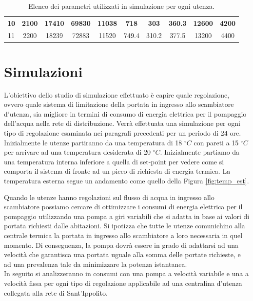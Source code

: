 \documentclass[laurea,oneside,11pt]{USiena_tesiLM3}
\begin{document}
\begin{table}[!ht]
{\begin{tabular}{|c|c|c|c|c|c|c|c|c|c|}
10              & 2100                                     & 17410        & 69830        & 11038       & 718         & 303         & 360.3       & 12600       & 4200        \\ \hline
11              & 2200                                     & 18239        & 72883        & 11520       & 749.4       & 310.2       & 377.5       & 13200       & 4400        \\ \hline
\end{tabular}}
\caption{Elenco dei parametri utilizzati in simulazione per ogni utenza.}
\label{tab:par_utenze}
\end{table}

\section{Simulazioni}
L'obiettivo dello studio di simulazione effettuato è capire quale regolazione, ovvero quale sistema di limitazione della portata in ingresso allo scambiatore d'utenza, sia migliore in termini di consumo di energia elettrica per il pompaggio dell'acqua nella rete di distribuzione. Verrà effettuata una simulazione per ogni tipo di regolazione esaminata nei paragrafi precedenti per un periodo di 24 ore. Inizialmente le utenze partiranno da una temperatura di 18 $^{\circ}C$ con pareti a 15 $^{\circ}C$ per arrivare ad una temperatura desiderata di 20 $^{\circ}C$. Inizialmente partiamo da una temperatura interna inferiore a quella di set-point per vedere come si comporta il sistema di fronte ad un picco di richiesta di energia termica. La temperatura esterna segue un andamento come quello della Figura \ref{fig:temp_est}.

Quando le utenze hanno regolazioni sul flusso di acqua in ingresso allo scambiatore possiamo cercare di ottimizzare i consumi di energia elettrica per il pompaggio utilizzando una pompa a giri variabili che si adatta in base ai valori di portata richiesti dalle abitazioni. Si ipotizza che tutte le utenze comunichino alla centrale termica la portata in ingresso allo scambiatore a loro necessaria in quel momento. Di conseguenza, la pompa dovrà essere in grado di adattarsi ad una  velocità che garantisca una portata uguale alla somma delle portate richieste, e ad una prevalenza tale da minimizzare la potenza istantanea.\\

In seguito si analizzeranno in consumi con una pompa a velocità variabile e una a velocità fissa per ogni tipo di regolazione applicabile ad una centralina d'utenza collegata alla rete di Sant'Ippolito. 
\end{document}
